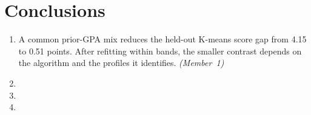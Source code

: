 \section{Conclusions}
\label{sec:conclusions}

\begin{enumerate}
  \item A common prior-GPA mix reduces the held-out K-means score gap
        from 4.15 to 0.51 points. After refitting within bands, the
        smaller contrast depends on the algorithm and the profiles it
        identifies. \emph{(Member~1)}
  \item {}
  \item {}
  \item {}
\end{enumerate}
